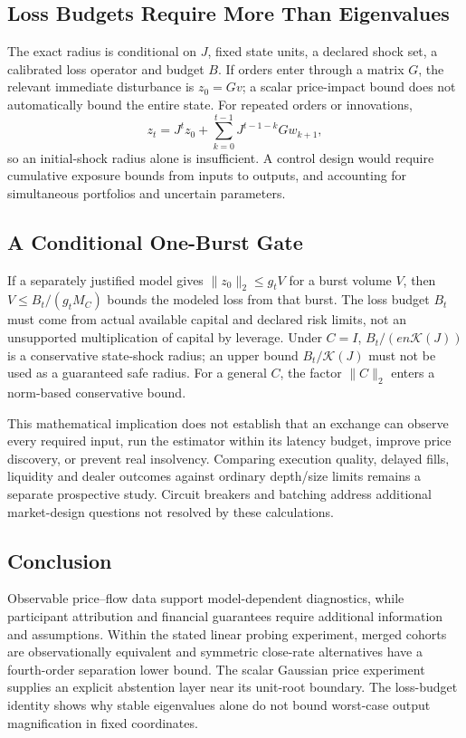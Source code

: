 \documentclass[12pt]{article}
\theoremstyle{definition}
\theoremstyle{remark}
\begin{document}
\subsection{Loss Budgets Require More Than Eigenvalues}
The exact radius is conditional on $J$, fixed state units, a declared shock set, a calibrated loss operator and budget $B$. If orders enter through a matrix $G$, the relevant immediate disturbance is $z_0=Gv$; a scalar price-impact bound does not automatically bound the entire state. For repeated orders or innovations,
\[
z_t=J^tz_0+\sum_{k=0}^{t-1}J^{t-1-k}Gw_{k+1},
\]
so an initial-shock radius alone is insufficient. A control design would require cumulative exposure bounds from inputs to outputs, and accounting for simultaneous portfolios and uncertain parameters.

\subsection{A Conditional One-Burst Gate}
If a separately justified model gives $\|z_0\|_2\le g_t V$ for a burst volume $V$, then $V\le B_t/(g_t M_C)$ bounds the modeled loss from that burst. The loss budget $B_t$ must come from actual available capital and declared risk limits, not an unsupported multiplication of capital by leverage. Under $C=I$, $B_t/(e n\mathcal K(J))$ is a conservative state-shock radius; an upper bound $B_t/\mathcal K(J)$ must not be used as a guaranteed safe radius. For a general $C$, the factor $\|C\|_2$ enters a norm-based conservative bound.

This mathematical implication does not establish that an exchange can observe every required input, run the estimator within its latency budget, improve price discovery, or prevent real insolvency. Comparing execution quality, delayed fills, liquidity and dealer outcomes against ordinary depth/size limits remains a separate prospective study. Circuit breakers and batching address additional market-design questions not resolved by these calculations.

\subsection{Conclusion}
Observable price--flow data support model-dependent diagnostics, while participant attribution and financial guarantees require additional information and assumptions. Within the stated linear probing experiment, merged cohorts are observationally equivalent and symmetric close-rate alternatives have a fourth-order separation lower bound. The scalar Gaussian price experiment supplies an explicit abstention layer near its unit-root boundary. The loss-budget identity shows why stable eigenvalues alone do not bound worst-case output magnification in fixed coordinates.
\end{document}
